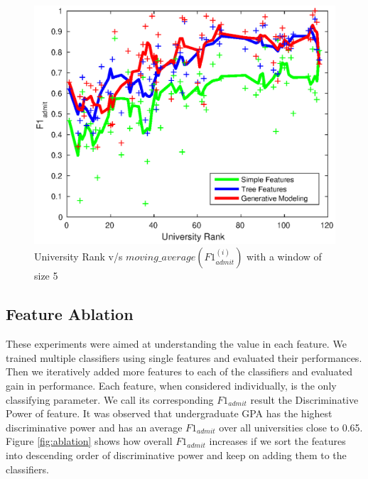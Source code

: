 \documentclass{sig-alternate-05-2015}
\begin{document}
\begin{figure}[t]
\centering
\includegraphics[scale=0.6]{rank_vs_simple_tree_em.eps}
\caption{University Rank v/s $moving\_average(F1^{(i)}_{admit})$ with a window of size 5}
\label{fig:rank_simple_tree_em}
\end{figure}


\subsection{Feature Ablation}
\label{subsec:ablation-exp}
These experiments were aimed at understanding the value in each feature. We trained multiple classifiers using single features and evaluated their performances. Then we iteratively added more features to each of the classifiers and evaluated gain in performance. Each feature, when considered individually, is the only classifying parameter. We call its corresponding $F1_{admit}$ result the Discriminative Power of feature. It was observed that undergraduate GPA has the highest discriminative power and has an average $F1_{admit}$ over all universities close to 0.65. Figure \ref{fig:ablation} shows how overall $F1_{admit}$ increases if we sort the features into descending order of discriminative power and keep on adding them to the classifiers.
\end{document}
